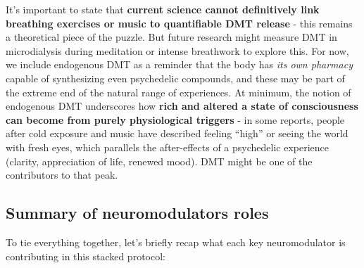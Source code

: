 \documentclass[11pt]{article}
\newcommand{\quotes}[1]{``#1''}
\begin{document}
It's important to state that \textbf{current science cannot definitively link breathing exercises or music to quantifiable DMT release} - this remains a theoretical piece of the puzzle. But future research might measure DMT in microdialysis during meditation or intense breathwork to explore this. For now, we include endogenous DMT as a reminder that the body has \textit{its own pharmacy} capable of synthesizing even psychedelic compounds, and these may be part of the extreme end of the natural range of experiences. At minimum, the notion of endogenous DMT underscores how \textbf{rich and altered a state of consciousness can become from purely physiological triggers} - in some reports, people after cold exposure and music have described feeling \quotes{high} or seeing the world with fresh eyes, which parallels the after-effects of a psychedelic experience (clarity, appreciation of life, renewed mood). DMT might be one of the contributors to that peak.

\subsection{Summary of neuromodulators roles}
To tie everything together, let's briefly recap what each key neuromodulator is contributing in this stacked protocol:
\end{document}
